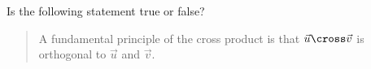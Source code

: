 \documentclass{ximera}
\author{Gregory Hartman \and Matthew Carr}
\begin{document}
\begin{exercise}




Is the following statement true or false?

\begin{quote}
A fundamental principle of the cross product is that $\vec{u}\cross\vec{v}$ is orthogonal to $\vec{u}$ and $\vec{v}$.
\end{quote}

\begin{multipleChoice}
\end{multipleChoice}

\end{exercise}
\end{document}

